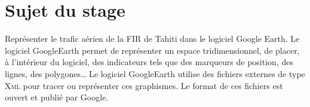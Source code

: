 




\section{Sujet du stage}
Représenter le trafic aérien de la FIR de Tahiti dans le logiciel Google Earth. Le logiciel GoogleEarth permet de représenter un espace tridimensionnel, de placer, à l’intérieur du logiciel, des indicateurs tels que des marqueurs de position, des lignes, des polygones… Le logiciel GoogleEarth utilise des fichiers externes de type \textsc{Xml} pour tracer ou représenter ces graphismes. Le format de ces fichiers est ouvert et publié par Google. 

